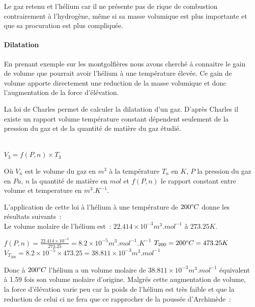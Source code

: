 \documentclass[a4paper,11pt]{article}
\begin{document}
Le gaz retenu et l'hélium car il ne présente pas de rique de combustion contrairement à l'hydrogène, même si sa masse volumique est plus importante et que sa procuration est plus compliquée.

\paragraph{Dilatation}

En prenant exemple sur les montgolfières nous avons cherché à connaitre le gain de volume que pourrait avoir l'hélium à une température élevée. Ce gain de volume apporte directement une reduction de la masse volumique et donc l'augmentation de la force d'élévation.

La loi de Charles permet de calculer la dilatation d'un gaz. D'après Charles il existe un rapport volume température constant dépendent seulement de la pression du gaz et de la quantité de matière du gaz étudié.

\begin{center}
  \\
 $\displaystyle{V_3 = f(P, n) \times T_3}$
\end{center}

Où $V_n$ est le volume du gaz en $m^3$ à la température $T_n$ en $K$, $P$ la pression du gaz en $Pa$, $n$ la quantité de matière en $mol$ et $f(P, n)$ le rapport constant entre volume et temperature en $m^3.K^{-1}$.

L'application de cette loi à l'hélium à une température de $200 \degree C $ donne les résultats suivants~: \\

Le volume molaire de l'hélium est~: $22.414\times 10^{-3} m^3.mol^{-1}$ à $273.25K$. \\

\begin{center}
	$\displaystyle{f(P, n) = \frac{22.414\times 10^{-3}}{273.25} = 8.2\times 10^{-5} m^3.mol^{-1}.K^{-1}}$
	\bigbreak
	$T_{200} = 200 \degree C = 473.25K$
	\medbreak
	$\displaystyle{V_{T_{200}} = 8.2\times 10^{-5} \times 473.25 = 38.811 \times 10^{-3}} m^3.mol^{-1}$
\end{center}

Donc à $200 \degree C$ l'hélium a un volume molaire de $38.811 \times 10^{-3} m^3.mol^{-1}$ équivalent à 1.59 fois son volume molaire d'origine. Malgrés cette augmentation de volume, la force d'élévation varie peu car la poids de l'hélium est très faible et que la reduction de celui ci ne fera que ce rapprocher de la poussée d'Archimède~: \\
\end{document}
